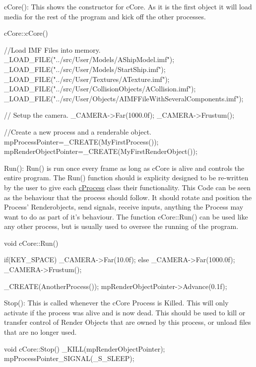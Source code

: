 cCore(): This shows the constructor for cCore. As it is the first object it will load media for the rest of the program and kick off the other processes. 
\begin{DoxyCode}
 cCore::cCore()
 {
 //Load IMF Files into memory.
  _LOAD_FILE("../src/User/Models/AShipModel.imf");
  _LOAD_FILE("../src/User/Models/StartShip.imf");
  _LOAD_FILE("../src/User/Textures/ATexture.imf");
  _LOAD_FILE("../src/User/CollisionObjects/ACollision.imf");
  _LOAD_FILE("../src/User/Objects/AIMFFileWithSeveralComponents.imf");

 // Setup the camera.
  _CAMERA->Far(1000.0f);
  _CAMERA->Frustum();

 //Create a new process and a renderable object.
  mpProcessPointer=_CREATE(MyFirstProcess());
  mpRenderObjectPointer=_CREATE(MyFirstRenderObject());

 }
\end{DoxyCode}


Run(): Run() is run once every frame as long as cCore is alive and controls the entire program. The Run() function should is explicity designed to be re-\/written by the user to give each \hyperlink{classc_process}{cProcess} class their functionality. This Code can be seen as the behaviour that the process should follow. It should rotate and position the Process' Renderobjects, send signals, receive inputs, anything the Process may want to do as part of it's behaviour. The function cCore::Run() can be used like any other process, but is usually used to oversee the running of the program. 
\begin{DoxyCode}
 void cCore::Run()
 {

  if(KEY_SPACE) _CAMERA->Far(10.0f);
   else _CAMERA->Far(1000.0f);
  _CAMERA->Frustum();

  _CREATE(AnotherProcess());
  mpRenderObjectPointer->Advance(0.1f);

 }
\end{DoxyCode}


Stop(): This is called whenever the cCore Process is Killed. This will only activate if the process was alive and is now dead. This should be used to kill or transfer control of Render Objects that are owned by this process, or unload files that are no longer used.


\begin{DoxyCode}
 void cCore::Stop()
 {
 _KILL(mpRenderObjectPointer);
 mpProcessPointer_SIGNAL(_S_SLEEP);
 }
\end{DoxyCode}


